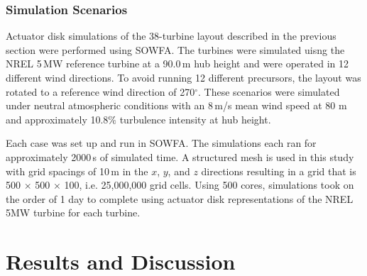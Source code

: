 \documentclass[conf]{new-aiaa}
\begin{document}
\subsubsection{Simulation Scenarios}

Actuator disk simulations of the 38-turbine layout described in the previous section were performed using SOWFA.  The turbines were simulated uisng the NREL 5\,MW reference turbine \cite{jonkman2009definition} at a 90.0\,m hub height and were operated in 12 different wind directions. To avoid running 12 different precursors, the layout was rotated to a reference wind direction of 270$^\circ$.  These scenarios were simulated under neutral atmospheric conditions with an 8\,m/s mean wind speed at 80 m and approximately 10.8$\%$ turbulence intensity at hub height.

Each case was set up and run in SOWFA.  The simulations each ran for approximately 2000\,s of simulated time.  A structured mesh is used in this study with grid spacings of 10\,m in the $x$, $y$, and $z$ directions resulting in a grid that is 500 $\times$ 500 $\times$ 100, i.e. 25,000,000 grid cells.  Using 500 cores, simulations took on the order of 1 day to complete using actuator disk representations of the NREL 5MW turbine for each turbine.  




\section{Results and Discussion}
\end{document}
